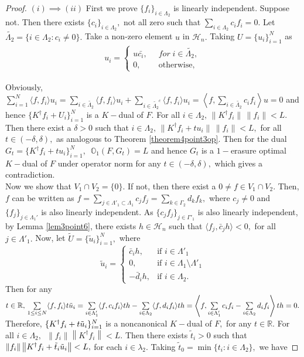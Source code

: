 \documentclass[final,1p,times]{elsarticle}
\begin{document}
\begin{proof}
	$(i)\implies (ii)$ First we prove $\{f_i\}_{i \in \Lambda_2}$ is linearly independent. Suppose not. Then there exists $\{c_i\}_{i \in \Lambda_2},$ not all zero such that $\sum\limits_{i \in \Lambda_2}c_i f_i =0.$ Let $\widetilde{\Lambda_2} = \{i \in \Lambda_2 : c_i \neq 0\}.$ Take a non-zero element $u$ in $\mathcal{H}_n.$  Taking $U =\{u_i\}_{i=1}^N$ as
	\begin{align*}
		u_i = \begin{cases}
			u\bar{c_i}, \;\;& for \;i \in \widetilde{\Lambda_2},\\
			0,\;\; &\text{otherwise},
		\end{cases}
	\end{align*}

Obviously, $\sum\limits_{i=1}^N \langle f,f_i\rangle u_i = \sum\limits_{i \in \widetilde{\Lambda_2}} \langle f,f_i\rangle u_i + \sum\limits_{i \in \widetilde{\Lambda_2}^c} \langle f,f_i\rangle u_i =  \left\langle f,\sum\limits_{i \in \widetilde{\Lambda_2}} c_if_i\right\rangle u =0$ and hence $\{K^\dag f_i + U_i\}_{i=1}^N$ is a $K-$dual of $F.$ For all $i \in \Lambda_2,\,\|K^\dag f_i\|\,\|f_i\| <L.$ Then there exist a $\delta >0$ such that  $i \in \Lambda_2,\,\|K^\dag f_i + tu_i\|\,\|f_i\| <L, $ for all $t \in (-\delta, \delta),$ as analogous to Theorem \ref{theorem4point3op}. Then for the dual $G_t = \{K^\dag f_i + tu_i\}_{i=1}^N,\,$ $\mathbb{O}_{1} (F, G_t) = L$ and hence $G_t$ is a $1-$erasure optimal $K-$dual of $F$ under operator norm for any $t \in  (-\delta, \delta),$ which gives a contradiction. \\
Now we show that $V_1 \cap V_2 = \{0\}.$ If not, then there exist a $0 \neq f \in V_1 \cap V_2.$
Then, $f$ can be written as $f= \sum\limits_{j \in \Lambda'_1 \subset \Lambda_1} c_{j} f_{j} = \sum\limits_{k \in \Gamma_2} d_k f_k, $ where $c_j \neq 0$ and $\{f_{j}\}_{j \in \Lambda_1'}$  is also linearly independent. As $\{ c_j f_j\}_{j \in \Gamma'_1}$ is also linearly  independent, by Lemma \ref{lem3point6}, there exists  $h\in \mathcal{H}_n$ such that $\langle  f_j, \bar{c}_j h \rangle <0,$ for all $ j \in \Lambda'_1.$ Now, let  $\tilde{U} =\{\tilde{u}_i\}_{i=1}^N,$ where
\[	\tilde{u}_i=\begin{cases}
	\bar{c}_i h, & \text{if $i \in \Lambda'_1$}\\
	0, & \text{if $i \in \Lambda_1 \setminus \Lambda'_1$}\\
	-\bar{d}_i h, & \text{if $i \in \Lambda_2$}.
\end{cases}
\] 
Then for any $t\in \mathbb{R},\, \sum\limits_{1\leq i \leq N} \langle f,f_i \rangle t \Tilde{u}_i  =\sum\limits_{i \in \Lambda'_1} \langle f,c_if_i \rangle th - \sum\limits_{i \in \Lambda_2} \langle f,d_if_i \rangle th = \left\langle f, \sum\limits_{i \in \Lambda'_1}c_i f_i - \sum\limits_{i \in \Lambda_2} d_i f_i \right\rangle th =0.$ Therefore, $ \{K^\dag f_i + t\Tilde{u}_i\}_{i=1}^N$ is a noncanonical $K-$dual of $F,$ for any $t \in \mathbb{R}.$ For all $i \in \Lambda_2,\,$ $ \|f_i\|\left\|K^\dag f_i  \right\|  < L.$ Then there exists $\tilde{t}_i >0$ such that $ \|f_i\|\left\|K^\dag f_i + \tilde{t}_i \Tilde{u}_i \right\|  < L,$ for each $i \in \lambda_2.$ Taking  $ \tilde{t}_0 = \min \{t_i : i \in \Lambda_2\},$ we have 

\end{proof}
\end{document}
